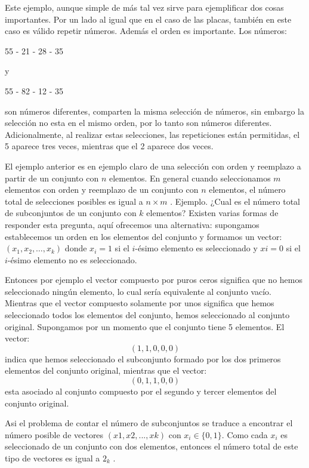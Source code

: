 \documentclass[14pt]{extreport}
\newcounter{ejemplo}[chapter]
\begin{document}
Este ejemplo, aunque simple de más tal vez sirve para ejemplificar dos cosas importantes. Por un lado al igual que en el caso de las placas, también en este caso es válido repetir números. Además el orden es importante. Los números:

\begin{center}
  55 - 21 - 28 - 35
\end{center}

y
\begin{center}
  55 - 82 - 12 - 35
\end{center}


son números diferentes, comparten la misma selección de números, sin embargo la selección no esta en el mismo orden, por lo tanto son números diferentes. Adicionalmente, al realizar estas selecciones, las repeticiones están permitidas, el 5 aparece tres veces, mientras que el 2 aparece dos veces.

El ejemplo anterior es en ejemplo claro de una selección con orden y reemplazo a partir de un conjunto con $n$ elementos. En general cuando seleccionamos $m$ elementos con orden y reemplazo de un conjunto con $n$ elementos, el número total de selecciones posibles es igual a $n\times m$ . Ejemplo. ¿Cual es el número total de subconjuntos de un conjunto con $k$ elementos? Existen varias formas de responder esta pregunta, aquí ofrecemos una alternativa: supongamos establecemos un orden en los elementos del conjunto y formamos un vector: $(x_1 , x_2,\ldots, x_k )$ donde $x_i = 1$ si el $i$-ésimo elemento es seleccionado y $xi = 0$ si el $i$-ésimo elemento no es seleccionado.

Entonces por ejemplo el vector compuesto por puros ceros significa que no hemos seleccionado ningún elemento, lo cual sería equivalente al conjunto vacío. Mientras que el vector compuesto solamente por unos significa que hemos seleccionado todos los elementos del conjunto, hemos seleccionado al conjunto original. Supongamos por un momento que el conjunto tiene 5 elementos. El vector:
$$
  (1, 1, 0, 0, 0)
$$
indica que hemos seleccionado el subconjunto formado por los dos primeros elementos del conjunto original, mientras que el vector:
$$
  (0, 1, 1, 0, 0)
$$
esta asociado al conjunto compuesto por el segundo y tercer elementos del conjunto original.

Asi el problema de contar el número de subconjuntos se traduce a encontrar el número posible de vectores $(x1 , x2 , . . . , xk
  )$ con $x_i \in \{0, 1\}$. Como cada $x_i$ es seleccionado de un conjunto con dos elementos, entonces el número total de este tipo de vectores es igual a $2_k$ .
\end{document}
